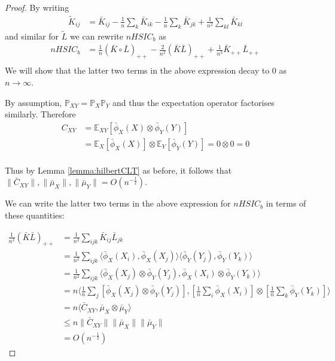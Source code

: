 \documentclass[]{article}
\begin{document}
\begin{proof}
By writing
\begin{align*}
\tilde{K}_{ij} &= \bar{K}_{ij} - \frac{1}{n}\sum_k\bar{K}_{ik} - \frac{1}{n}\sum_k\bar{K}_{jk} + \frac{1}{n^2}\sum_{kl}\bar{K}_{kl}
\end{align*} 
and similar for $\tilde{L}$ we can rewrite $nHSIC_b$ as 
\begin{align*}
nHSIC_b & = \frac{1}{n} (\bar{K}\circ \bar{L})_{++}  - \frac{2}{n^2}(\bar{K}\bar{L})_{++} + \frac{1}{n^3}\bar{K}_{++}\bar{L}_{++} \\
\end{align*}
We will show that the latter two terms in the above expression decay to 0 as $n\longrightarrow\infty$. 

By assumption, $\mathbb{P}_{XY} = \mathbb{P}_X\mathbb{P}_Y$ and thus the expectation operator factorises similarly. Therefore 
\begin{align*}
C_{XY} & = \mathbb{E}_{XY}[\bar{\phi}_X(X)\otimes\bar{\phi}_Y(Y)] \\
& = \mathbb{E}_{X}[\bar{\phi}_X(X)]\otimes\mathbb{E}_Y[\bar{\phi}_Y(Y)] = 0\otimes 0 = 0\\
\end{align*}

Thus by Lemma \ref{lemma:hilbertCLT} as before, it follows that $\|\bar{C}_{XY}\|, \|\bar{\mu}_X\|, \|\bar{\mu}_Y\| = O(n^{-\frac{1}{2}})$. 

We can write the latter two terms in the above expression for $nHSIC_b$ in terms of these quantities:

\begin{align*}
\frac{1}{n^2}(\bar{K}\bar{L})_{++} &= \frac{1}{n^2} \sum_{ijk}\bar{K}_{ij}\bar{L}_{jk}\\
&= \frac{1}{n^2} \sum_{ijk}\langle \bar{\phi}_X(X_i),\bar{\phi}_X(X_j) \rangle \langle \bar{\phi}_Y(Y_j),\bar{\phi}_Y(Y_k)\rangle \\&=
\frac{1}{n^2} \sum_{ijk}\langle \bar{\phi}_X(X_j)\otimes\bar{\phi}_Y(Y_j),
\bar{\phi}_X(X_i)\otimes\bar{\phi}_Y(Y_k)\rangle \\&=
n\langle \frac{1}{n} \sum_{j}[\bar{\phi}_X(X_j)\otimes\bar{\phi}_Y(Y_j)],
[\frac{1}{n} \sum_{i}\bar{\phi}_X(X_i)]\otimes[\frac{1}{n} \sum_{k}\bar{\phi}_Y(Y_k)]\rangle \\&=
n\langle \bar{C}_{XY},\bar{\mu}_X  \otimes \bar{\mu}_Y \rangle \\ 
&\leq n \|\bar{C}_{XY}\|\|\bar{\mu}_X\| \| \bar{\mu}_Y\|\\
&= O(n^{-\frac{1}{2}})
\end{align*}


\end{proof}
\end{document}
